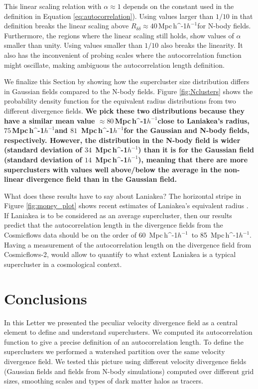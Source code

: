 \documentclass[usenatbib]{mnras}
\newcommand{\Mpch}{\,{\rm Mpc}\,\ifmmode h^{-1}\else $h^{-1}$\fi}
\begin{document}
This linear scaling relation with $\alpha\approx 1$ depends on the constant used in the definition in Equation \ref{eq:autocorrelation}). 
Using values larger than $1/10$ in that definition breaks the linear scaling above $R_{\delta\delta}\approx 40$\Mpch for N-body fields. 
Furthermore, the regions where the linear scaling still holds, show values of $\alpha$ smaller than unity. 
Using values smaller than $1/10$ also breaks the linearity. 
It also has the inconvenient of probing scales where the autocorrelation function might oscillate, making ambiguous the autocorrelation length definition.
    
We finalize this Section by showing how the supercluster size distribution differs in Gaussian fields compared to the N-body fields.
Figure \ref{fig:Nclusters} shows the probability density function for the equivalent radius distributions from two different divergence fields.
\textbf{
We pick these two distributions because they have a similar mean value $\approx80$\Mpch close to Laniakea's radius, $75$\Mpch and $81$ \Mpch for the Gaussian and N-body fields, respectively. 
However, the distribution in the N-body field is wider (standard deviation of $34$ \Mpch) than it is for the Gaussian field (standard deviation of $14$ \Mpch), meaning that there are more superclusters with values well above/below the average in the non-linear divergence field than in the Gaussian field. }


What does these results have to say about Laniakea?
The horizontal stripe in Figure \ref{fig:money_plot} shows recent estimates of Laniakea's equivalent radius \citep{Dupuy_2019}. 
If Laniakea is to be considered as an average supercluster, then our results predict that the autocorrelation length in the divergence fields from the Cosmicflows data should be on the order of 60 \Mpch\ to 85 \Mpch.
Having a measurement of the autocorrelation length on the divergence field from Cosmicflows-2, would allow to quantify to what extent Laniakea is a typical supercluster in a cosmological context.
 



\section{Conclusions}
\label{sec:conclusion}


In this Letter we presented the peculiar velocity divergence field as a central element to define and understand superclusters.
We computed its autocorrelation function to give a precise definition of an autocorrelation length. 
To define the superclusters we performed a watershed partition over the same velocity divergence field. 
We tested this picture using different velocity divergence fields (Gaussian fields and fields from N-body simulations) computed over different grid sizes, smoothing scales and types of dark matter halos as tracers.
\end{document}
